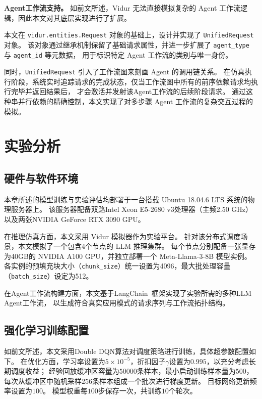 \textbf{Agent工作流支持。}
如前文所述，Vidur 无法直接模拟复杂的 Agent 工作流逻辑，因此本文对其底层实现进行了扩展。

本文在 \texttt{vidur.entities.Request} 对象的基础上，设计并实现了 \texttt{UnifiedRequest} 对象。
该对象通过继承机制保留了基础请求属性，并进一步扩展了 \texttt{agent\_type} 与 \texttt{agent\_id} 等元数据，
用于标识特定 Agent 工作流的类别与唯一身份。

同时，\texttt{UnifiedRequest} 引入了工作流图来刻画 Agent 的调用链关系。
在仿真执行阶段，系统实时追踪请求的完成状态，仅当工作流图中所有的前序依赖请求均执行完毕并返回结果后，
才会激活并发射该Agent工作流的后续阶段请求。
通过这种串并行依赖的精确控制，本文实现了对多步骤 Agent 工作流的复杂交互过程的模拟。


\section{实验分析}\label{sec:chap4-experiment}

\subsection{硬件与软件环境}

本章所述的模型训练与实验评估均部署于一台搭载 Ubuntu 18.04.6 LTS 系统的物理服务器上。
该服务器配备双路Intel Xeon E5-2680 v3处理器（主频2.50 GHz）以及两张NVIDIA GeForce RTX 3090 GPU。

在推理仿真方面，本文采用 Vidur 模拟器作为实验平台。
针对该分布式调度场景，本文模拟了一个包含4个节点的 LLM 推理集群。
每个节点分别配备一张显存为40GB的 NVIDIA A100 GPU，并独立部署一个 Meta-Llama-3-8B 模型实例。
各实例的预填充块大小（\texttt{chunk\_size}）统一设置为4096，最大批处理容量（\texttt{batch\_size}）设定为512。

在Agent工作流构建方面，本文基于LangChain~\cite{langchain}框架实现了实验所需的多种LLM Agent工作流，
以生成符合真实应用模式的请求序列与工作流拓扑结构。

\subsection{强化学习训练配置}

如前文所述，本文采用Double DQN算法对调度策略进行训练，具体超参数配置如下。
在优化方面，学习率设置为$5\times10^{-5}$，折扣因子$\gamma$设置为$0.995$，以充分考虑长期调度收益；
经验回放缓冲区容量为$50000$条样本，最小启动训练样本量为$500$，
每次从缓冲区中随机采样$256$条样本组成一个批次进行梯度更新。
目标网络更新频率设置为$100$。
模型权重每$100$步保存一次，共训练$10$个轮次。

